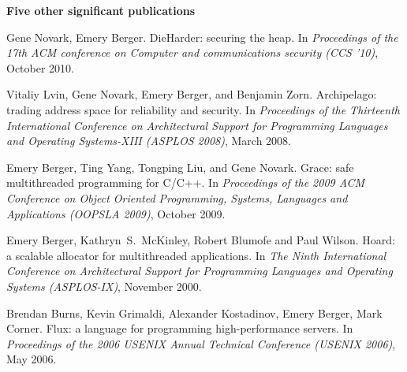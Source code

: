 \documentclass[11pt]{article}
\begin{document}
\begin{description}
\setlength{\labelsep}{0ex}
\setlength{\itemsep}{-0.5ex}

\item {\bf\textsf {Five other significant publications}}


\item Gene Novark, Emery Berger. {DieHarder}: securing the heap. In {\em Proceedings of the 17th ACM conference on Computer and communications security ({CCS} '10)}, October 2010.

\item Vitaliy Lvin, Gene Novark, Emery Berger, and Benjamin Zorn. Archipelago: trading address space for reliability and security.  In {\em Proceedings of the Thirteenth International Conference on Architectural Support for Programming Languages and Operating Systems-XIII ({ASPLOS} 2008)}, March 2008.


\item Emery Berger, Ting Yang, Tongping Liu, and Gene Novark. Grace: safe multithreaded programming for {C/C++}. In {\em Proceedings of the 2009 {ACM} Conference on Object Oriented Programming, Systems, Languages and Applications ({OOPSLA 2009})}, October 2009.

\item Emery Berger, Kathryn~S.~McKinley, Robert Blumofe and Paul Wilson. Hoard: a scalable allocator for multithreaded applications. In {\em The Ninth International Conference on Architectural Support for Programming Languages and Operating Systems ({ASPLOS}-IX)}, November 2000.


\item Brendan Burns, Kevin Grimaldi, Alexander Kostadinov, Emery Berger, Mark Corner. Flux: a language for programming high-performance servers. In {\em Proceedings of the 2006 {USENIX} Annual Technical Conference ({USENIX} 2006)}, May 2006.

\end{description}
\end{document}
